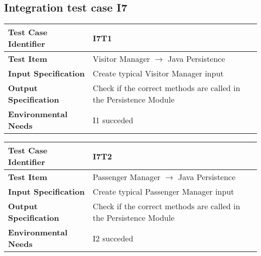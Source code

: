\subsection{Integration test case I7}

\begin{table}[!htbp]
\begin{center}
\begin{tabular}[t]{p{}p{}}

\hline
\textbf{Test Case Identifier} & I7T1 \\
\hline
\textbf{Test Item} & Visitor Manager $\rightarrow$ Java Persistence \\
\hline
\textbf{Input Specification} & Create typical Visitor Manager input  \\
\hline
\textbf{Output Specification} & Check if the correct methods are called in the Persistence Module \\
\hline
\textbf{Environmental Needs} & I1 succeded \\
\hline

\end{tabular}
\end{center}
\end{table}

\begin{table}[!htbp]
\begin{center}
\begin{tabular}[t]{p{}p{}}

\hline
\textbf{Test Case Identifier} & I7T2 \\
\hline
\textbf{Test Item} & Passenger Manager $\rightarrow$ Java Persistence \\
\hline
\textbf{Input Specification} & Create typical Passenger Manager input \\
\hline
\textbf{Output Specification} & Check if the correct methods are called in the Persistence Module \\
\hline
\textbf{Environmental Needs} & I2 succeded \\
\hline

\end{tabular}
\end{center}
\end{table}

